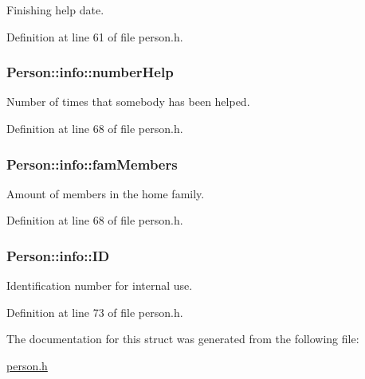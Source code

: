 Finishing help date. 



Definition at line 61 of file person.\+h.

\hypertarget{struct_person_1_1info_a6fd0e334bf6cc9baf667ef94806ed993}{
\subsubsection[{number\+Help}]{\setlength{\rightskip}{0pt plus 5cm}Person\+::info\+::number\+Help}}\label{struct_person_1_1info_a6fd0e334bf6cc9baf667ef94806ed993}


Number of times that somebody has been helped. 



Definition at line 68 of file person.\+h.

\hypertarget{struct_person_1_1info_afc121f83e810c2c0318e115f4ba6d730}{
\subsubsection[{fam\+Members}]{\setlength{\rightskip}{0pt plus 5cm}Person\+::info\+::fam\+Members}}\label{struct_person_1_1info_afc121f83e810c2c0318e115f4ba6d730}


Amount of members in the home family. 



Definition at line 68 of file person.\+h.

\hypertarget{struct_person_1_1info_a535ca27747d371eb58005194190f6bd6}{
\subsubsection[{I\+D}]{\setlength{\rightskip}{0pt plus 5cm}Person\+::info\+::\+I\+D}}\label{struct_person_1_1info_a535ca27747d371eb58005194190f6bd6}


Identification number for internal use. 



Definition at line 73 of file person.\+h.



The documentation for this struct was generated from the following file\+:\begin{DoxyCompactItemize}
\item 
\hyperlink{person_8h}{person.\+h}\end{DoxyCompactItemize}
